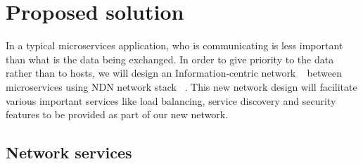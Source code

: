\section{Proposed solution}\label{solution}

In a typical microservices application, who is communicating is less important than what is the data being exchanged. In order to give priority to the data rather than to hosts, we will design an Information-centric network ~\cite{Ahlgren} between microservices using NDN network stack ~\cite{zhang2014named}. This new network design will facilitate various important services like load balancing, service discovery and security features to be provided as part of our new network.

\subsection{Network services}

